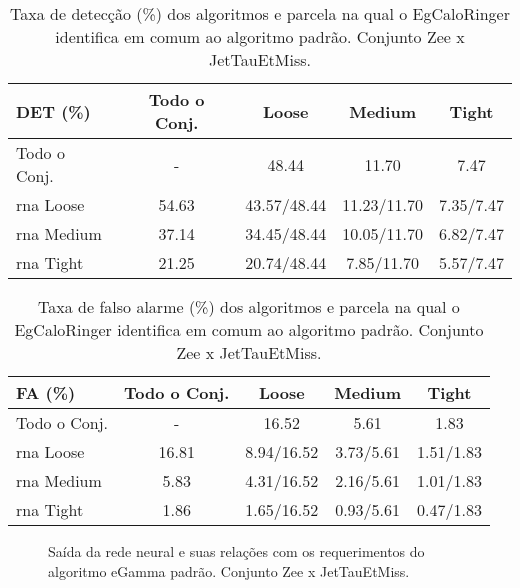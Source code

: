 \begin{table}[htb]
\centering
\begin{tabular}{l cccc}
\hline
\hline
DET (\%)& Todo o Conj. & Loose & Medium & Tight \\
\hline
Todo o Conj.   &    - &  48.44 &  11.70 &  7.47  \\ 
\hline
\gls{rna} Loose & 54.63 & 43.57/48.44 & 11.23/11.70 & 7.35/7.47 \\
\hline
\gls{rna} Medium & 37.14 & 34.45/48.44 & 10.05/11.70 & 6.82/7.47 \\
\hline
\gls{rna} Tight &  21.25 & 20.74/48.44 & 7.85/11.70  & 5.57/7.47 \\
\hline
\hline
\end{tabular}
\caption{Taxa de detecção (\%) dos algoritmos e parcela na qual o EgCaloRinger
identifica em comum ao algoritmo padrão. Conjunto Zee x JetTauEtMiss.}
\label{tab:zeexjet_efic_det}
\end{table}

\begin{table}[htb]
\centering
\begin{tabular}{l cccc}
\hline
\hline
FA (\%)& Todo o Conj. & Loose & Medium & Tight \\
\hline
Todo o Conj.  &  - & 16.52 & 5.61 & 1.83 \\
\hline
\gls{rna} Loose  & 16.81 & 8.94/16.52 &  3.73/5.61 & 1.51/1.83 \\
\hline                                             
\gls{rna} Medium & 5.83  & 4.31/16.52 &  2.16/5.61 & 1.01/1.83 \\
\hline
\gls{rna} Tight  & 1.86  & 1.65/16.52 &  0.93/5.61 & 0.47/1.83 \\
\hline
\hline
\end{tabular}
\caption{Taxa de falso alarme (\%) dos algoritmos e parcela na qual o EgCaloRinger
identifica em comum ao algoritmo padrão. Conjunto Zee x JetTauEtMiss.}
\label{tab:zeexjet_fa_det}
\end{table}


\begin{figure}[ht]
\centering
{}
\label{fig:zeexjet_saidaneural}
\caption{Saída da rede neural e suas relações com os requerimentos do algoritmo
eGamma padrão. Conjunto Zee x JetTauEtMiss. }
\end{figure}

